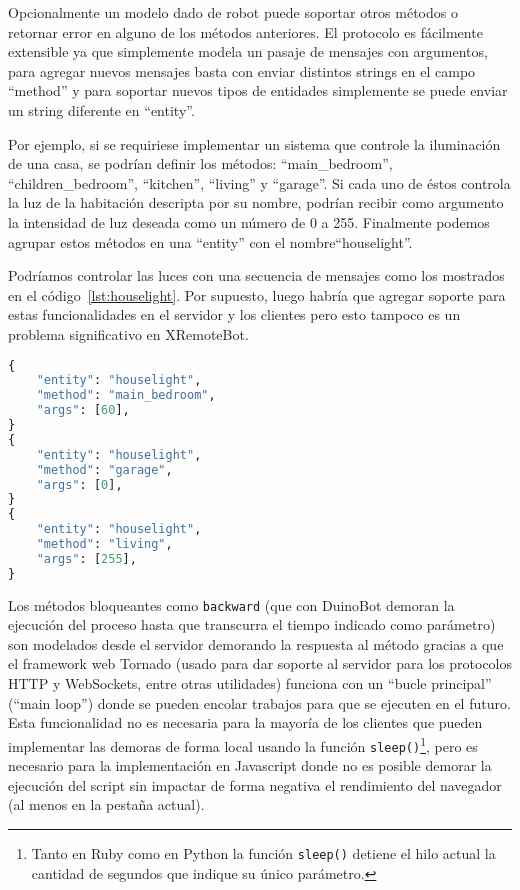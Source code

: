 Opcionalmente un modelo dado de robot puede soportar otros métodos o retornar
error en alguno de los métodos anteriores. El protocolo es fácilmente
extensible ya que simplemente modela un pasaje de mensajes con argumentos,
para agregar nuevos mensajes basta con enviar distintos strings en el
campo ``method'' y para soportar nuevos tipos de entidades simplemente
se puede enviar un string diferente en ``entity''.

Por ejemplo, si se requiriese implementar
un sistema que controle la iluminación de una casa,
se podrían definir los métodos: ``main\_bedroom'', ``children\_bedroom'',
``kitchen'', ``living'' y ``garage''. Si cada uno de éstos
controla la luz de la habitación descripta por su nombre, podrían recibir
como
argumento la intensidad de luz deseada como un número de 0 a 255. Finalmente
podemos agrupar estos métodos en una ``entity'' con el nombre``houselight''.

Podríamos controlar las luces con una secuencia de mensajes como
los mostrados en el código~\ref{lst:houselight}. Por supuesto, luego
habría que agregar soporte para estas funcionalidades en el servidor
y los clientes pero esto tampoco es
un problema significativo en XRemoteBot.

\begin{lstlisting}[language=python,
caption={Ejemplo de una posible extensión al protocolo para controlar
las luces de una casa},
label=lst:houselight]
{
    "entity": "houselight",
    "method": "main_bedroom",
    "args": [60],
}
{
    "entity": "houselight",
    "method": "garage",
    "args": [0],
}
{
    "entity": "houselight",
    "method": "living",
    "args": [255],
}
\end{lstlisting}


Los métodos bloqueantes como \texttt{backward} (que con DuinoBot demoran
la ejecución del proceso hasta que transcurra el tiempo indicado como
parámetro) son modelados desde el servidor demorando la respuesta al método
gracias a que el framework web Tornado (usado para dar soporte al servidor
para los protocolos HTTP y WebSockets, entre otras utilidades)
funciona con un ``bucle principal''
(``main loop'') donde se pueden encolar trabajos para que se ejecuten
en el futuro.
Esta funcionalidad no es necesaria para la mayoría de los clientes que
pueden implementar las demoras de forma local usando la función
\texttt{sleep()}\footnote{Tanto en Ruby como en Python la función \texttt{sleep()} detiene
el hilo actual la cantidad de segundos que indique su único parámetro.},
pero es necesario para la implementación en Javascript donde no es posible
demorar la ejecución del script sin impactar de forma negativa el rendimiento
del navegador (al menos en la pestaña actual).



